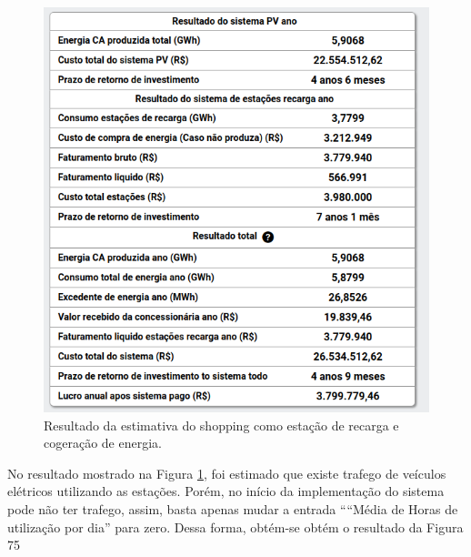 \begin{figure}[H]
    \centering
    \includegraphics[width=1\textwidth]{./Figuras/shopping_6.png}
    \caption{Resultado da estimativa do shopping como estação de recarga e cogeração de energia.}
   \label{fig:shopping_6}
\end{figure}

No resultado mostrado na Figura \ref{fig:shopping_6}, foi estimado que existe trafego de veículos elétricos utilizando as estações.  Porém, no início da implementação do sistema pode não ter trafego, assim, basta apenas mudar a entrada ``“Média de Horas de utilização por dia'' para zero.   Dessa forma,  obtém-se obtém o resultado da Figura 75

